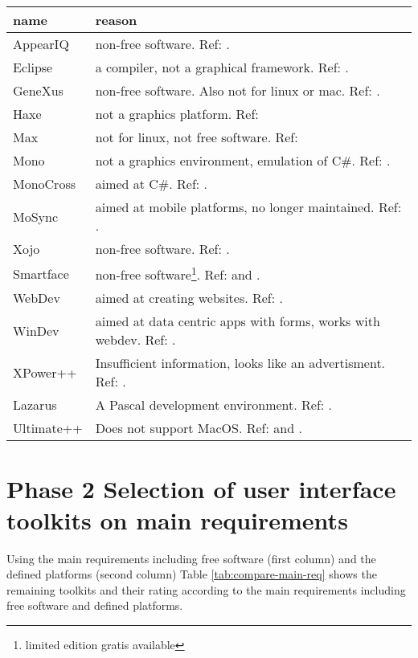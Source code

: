 \begin{center}
    \begin{tabular}{|p{7em}|p{25em}|}
	\hline
	{\bf name} & {\bf reason}\\\hline
	AppearIQ & non-free software. Ref: \cite{appear:appeariq}.\\
	Eclipse & a compiler, not a graphical framework. Ref: \cite{wiki:eclipse}.\\
	GeneXus & non-free software. Also not for linux
		    or mac. Ref: \cite{wiki:genexus}. \\
	Haxe & not a graphics platform. Ref: \cite{wiki:haxe}\\
	Max & not for linux, not free software. Ref: \cite{wiki:max}\\
	Mono & not a graphics environment, emulation
		of C\#. Ref: \cite{wiki:mono}.\\
	MonoCross & aimed at C\#. Ref: \cite{wiki:monocross}.\\
	MoSync & aimed at mobile platforms, no longer maintained. Ref: \cite{wiki:mosync}.\\
	Xojo & non-free software. Ref: \cite{wiki:xojo}.\\
	Smartface & non-free software\footnote{limited edition gratis available}. Ref: \cite{wiki:smartface} and \cite{smartface:license}.\\
	WebDev & aimed at creating websites. Ref: \cite{wiki:webdev}.\\
	WinDev & aimed at data centric apps with forms, works with webdev. Ref: \cite{wiki:windev}.\\
	XPower++ & Insufficient information, looks like an advertisment. Ref: \cite{wiki:xpower++}.\\
	Lazarus & A Pascal development environment. Ref: \cite{wiki:lazarus}.\\
	Ultimate++ & Does not support MacOS. Ref: \cite{wiki:ultimate++} and \cite{wxwidget:comparison}.\\
	\hline
    \end{tabular}
	\label{tab:discarded-toolkits}
\end{center}


\section{Phase 2 Selection of user interface toolkits on main requirements}

Using the main requirements including free software (first column) and the
defined platforms (second column) Table \ref{tab:compare-main-req} shows the
remaining toolkits and their rating according to the main requirements
including free software and defined platforms.

